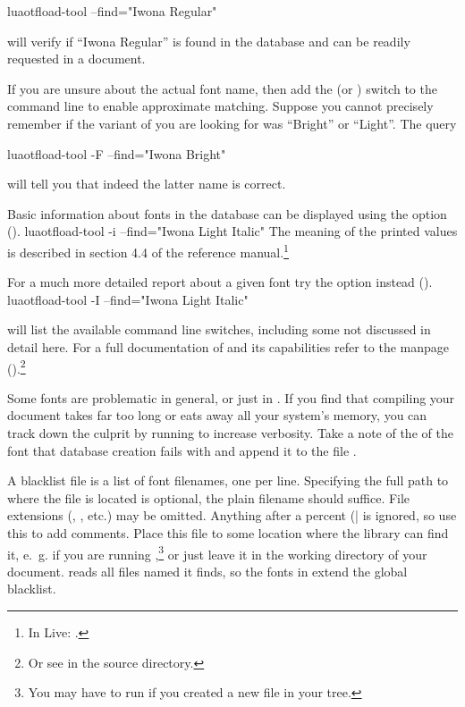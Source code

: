 \beginlisting
  luaotfload-tool  --find="Iwona Regular"
\endlisting

\noindent
will verify if “Iwona Regular” is found in the database and can be
readily requested in a document.

If you are unsure about the actual font name, then add the
 (or ) switch to the command line to enable
approximate matching.
%
Suppose you cannot precisely remember if the variant of
 you are looking for was “Bright” or “Light”.
The query

\beginlisting
  luaotfload-tool  -F --find="Iwona Bright"
\endlisting

\noindent
will tell you that indeed the latter name is correct.

Basic information about fonts in the database can be displayed
using the  option ().
%
\beginlisting
  luaotfload-tool  -i --find="Iwona Light Italic"
\endlisting
%
\noindent
The meaning of the printed values is described in section 4.4 of the
\LUATEX reference manual.\footnote{%
  In \TEX Live: .
}

For a much more detailed report about a given font try the
 option instead ().
\beginlisting
  luaotfload-tool  -I --find="Iwona Light Italic"
\endlisting

 will list the available command line
switches, including some not discussed in detail here.
%
For a full documentation of  and its
capabilities refer to the manpage
().\footnote{%
  Or see  in the source directory.
}

\endsubsection

\label{font-blacklist}

Some fonts are problematic in general, or just in \LUATEX.
%
If you find that compiling your document takes far too long or eats
away all your system’s memory, you can track down the culprit by
running  to increase verbosity.
%
Take a note of the  of the font that database
creation fails with and append it to the file
.

A blacklist file is a list of font filenames, one per line.
Specifying the full path to where the file is located is optional, the
plain filename should suffice.
%
File extensions (, , etc.) may be omitted.
%
Anything after a percent (|%
is ignored, so use this to add comments.
%
Place this file to some location where the 
library can find it, e.~g.
 if you are running
,\footnote{%
  You may have to run  if you created a new file in
  your  tree.
}
or just leave it in the working directory of your document.
%
 reads all files named
 it finds, so the fonts in
 extend the global blacklist.

